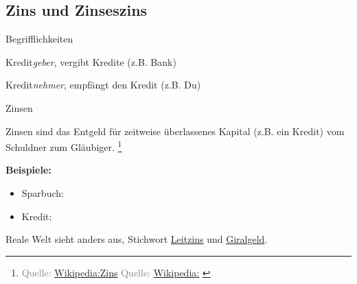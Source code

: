 \documentclass{beamer}
\let\oldfootnote\footnote
\renewcommand{\footnote}[1]
{%
	\oldfootnote
	{
		\tiny
		\textcolor{gray}{#1}
	}%
}
\newcommand{\citewiki}[2][]
{%
	\footnote
	{
		\ifthenelse{\isempty{#1}}
		{
			Quelle: \href{https://de.wikipedia.org/wiki/#2}{Wikipedia:#2}
		}
		{
			Quelle: \href{https://de.wikipedia.org/wiki/#2}{Wikipedia:#1}
		}
	}
}
\begin{document}
		\subsection{Zins und Zinseszins}
		
			\begin{frame}{Begrifflichkeiten}
				\begin{description}[labelwidth=0cm]
					\item[Gläubiger] Kredit\textit{geber}, vergibt Kredite (z.B. Bank)\pause
					\item[Schuldner] Kredit\textit{nehmer}, empfängt den Kredit (z.B. Du)
				\end{description}
			\end{frame}
		
			\begin{frame}{Zinsen}
				\begin{definition}
					Zinsen sind das Entgeld für zeitweise überlassenes Kapital (z.B. ein Kredit) vom Schuldner zum Gläubiger.\citewiki{Zins}
				\end{definition}
				\textbf{Beispiele:}
				\begin{multicols}{2}
					\begin{itemize}
						\item Sparbuch:\\
						\columnbreak
						\item Kredit:\\
					\end{itemize}
				\end{multicols}
				\vspace{-0.25cm}
				{\tiny Reale Welt sieht anders aus, Stichwort \href{https://de.wikipedia.org/wiki/Leitzins}{Leitzins} und \href{https://de.wikipedia.org/wiki/Buchgeld}{Giralgeld}.}
			\end{frame}
		
\end{document}
